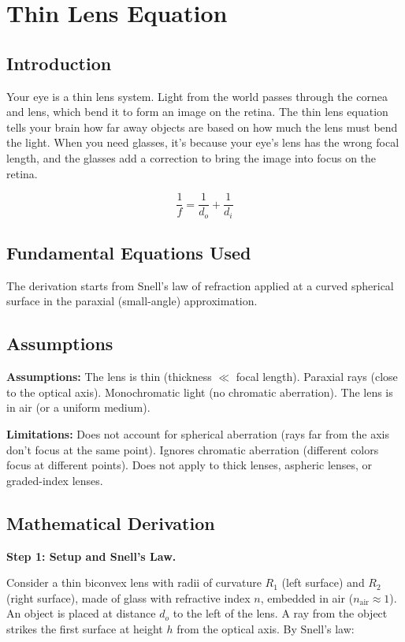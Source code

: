 \chapter{Thin Lens Equation}

\section*{Introduction}

Your eye is a thin lens system. Light from the world passes through the cornea and lens, which bend it to form an image on the retina. The thin lens equation tells your brain how far away objects are based on how much the lens must bend the light. When you need glasses, it's because your eye's lens has the wrong focal length, and the glasses add a correction to bring the image into focus on the retina.



\[
\frac{1}{f} = \frac{1}{d_o} + \frac{1}{d_i}
\]

\section*{Fundamental Equations Used}

The derivation starts from Snell's law of refraction applied at a curved spherical surface in the paraxial (small-angle) approximation.

\section*{Assumptions}

\textbf{Assumptions:} The lens is thin (thickness $\ll$ focal length). Paraxial rays (close to the optical axis). Monochromatic light (no chromatic aberration). The lens is in air (or a uniform medium).


\textbf{Limitations:} Does not account for spherical aberration (rays far from the axis don't focus at the same point). Ignores chromatic aberration (different colors focus at different points). Does not apply to thick lenses, aspheric lenses, or graded-index lenses.


\section*{Mathematical Derivation}

\textbf{Step 1: Setup and Snell's Law.}

Consider a thin biconvex lens with radii of curvature $R_1$ (left surface) and $R_2$ (right surface), made of glass with refractive index $n$, embedded in air ($n_{\text{air}} \approx 1$). An object is placed at distance $d_o$ to the left of the lens. A ray from the object strikes the first surface at height $h$ from the optical axis. By Snell's law:

